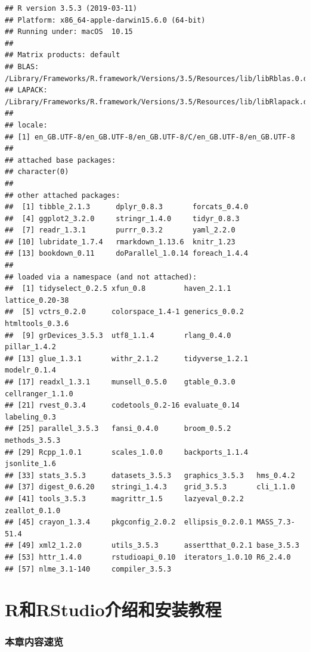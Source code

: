 \documentclass[]{book}
\begin{document}
\begin{verbatim}
## R version 3.5.3 (2019-03-11)
## Platform: x86_64-apple-darwin15.6.0 (64-bit)
## Running under: macOS  10.15
## 
## Matrix products: default
## BLAS: /Library/Frameworks/R.framework/Versions/3.5/Resources/lib/libRblas.0.dylib
## LAPACK: /Library/Frameworks/R.framework/Versions/3.5/Resources/lib/libRlapack.dylib
## 
## locale:
## [1] en_GB.UTF-8/en_GB.UTF-8/en_GB.UTF-8/C/en_GB.UTF-8/en_GB.UTF-8
## 
## attached base packages:
## character(0)
## 
## other attached packages:
##  [1] tibble_2.1.3      dplyr_0.8.3       forcats_0.4.0    
##  [4] ggplot2_3.2.0     stringr_1.4.0     tidyr_0.8.3      
##  [7] readr_1.3.1       purrr_0.3.2       yaml_2.2.0       
## [10] lubridate_1.7.4   rmarkdown_1.13.6  knitr_1.23       
## [13] bookdown_0.11     doParallel_1.0.14 foreach_1.4.4    
## 
## loaded via a namespace (and not attached):
##  [1] tidyselect_0.2.5 xfun_0.8         haven_2.1.1      lattice_0.20-38 
##  [5] vctrs_0.2.0      colorspace_1.4-1 generics_0.0.2   htmltools_0.3.6 
##  [9] grDevices_3.5.3  utf8_1.1.4       rlang_0.4.0      pillar_1.4.2    
## [13] glue_1.3.1       withr_2.1.2      tidyverse_1.2.1  modelr_0.1.4    
## [17] readxl_1.3.1     munsell_0.5.0    gtable_0.3.0     cellranger_1.1.0
## [21] rvest_0.3.4      codetools_0.2-16 evaluate_0.14    labeling_0.3    
## [25] parallel_3.5.3   fansi_0.4.0      broom_0.5.2      methods_3.5.3   
## [29] Rcpp_1.0.1       scales_1.0.0     backports_1.1.4  jsonlite_1.6    
## [33] stats_3.5.3      datasets_3.5.3   graphics_3.5.3   hms_0.4.2       
## [37] digest_0.6.20    stringi_1.4.3    grid_3.5.3       cli_1.1.0       
## [41] tools_3.5.3      magrittr_1.5     lazyeval_0.2.2   zeallot_0.1.0   
## [45] crayon_1.3.4     pkgconfig_2.0.2  ellipsis_0.2.0.1 MASS_7.3-51.4   
## [49] xml2_1.2.0       utils_3.5.3      assertthat_0.2.1 base_3.5.3      
## [53] httr_1.4.0       rstudioapi_0.10  iterators_1.0.10 R6_2.4.0        
## [57] nlme_3.1-140     compiler_3.5.3
\end{verbatim}

\hypertarget{intro-and-installation}{%
\chapter{R和RStudio介绍和安装教程}\label{intro-and-installation}}

\hypertarget{intro-overview}{%
\subsection*{本章内容速览}\label{intro-overview}}
\end{document}
